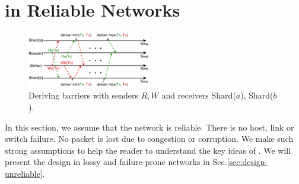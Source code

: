 \section{\sys in Reliable Networks}
\label{sec:design-reliable}

\begin{figure}[t]
\centering
\includegraphics[width=0.48\textwidth]{images/derive_barriers.pdf}
\caption{Deriving barriers with senders $R, W$ and receivers Shard($a$), Shard($b$).}
\label{fig:barrier}
\vspace{-1em}
\end{figure}

In this section, we assume that the network is reliable. There is no host, link or switch failure. No packet is lost due to congestion or corruption. We make such strong assumptions to help the reader to understand the key ideas of \sys. We will present the design in lossy and failure-prone networks in Sec.\ref{sec:design-unreliable}.







